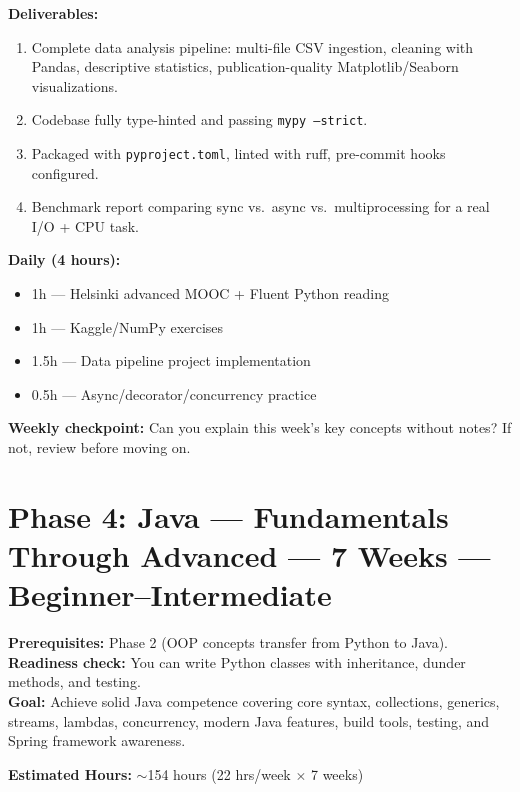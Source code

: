 \documentclass[11pt, a4paper, oneside]{report}
\begin{document}
\begin{milestonebox}
\textbf{Deliverables:}
\begin{enumerate}[leftmargin=*]
\item Complete data analysis pipeline: multi-file CSV ingestion, cleaning with Pandas, descriptive statistics, publication-quality Matplotlib/Seaborn visualizations.
\item Codebase fully type-hinted and passing \texttt{mypy --strict}.
\item Packaged with \texttt{pyproject.toml}, linted with ruff, pre-commit hooks configured.
\item Benchmark report comparing sync vs.\ async vs.\ multiprocessing for a real I/O + CPU task.
\end{enumerate}
\end{milestonebox}

\begin{practicebox}
\textbf{Daily (4 hours):}
\begin{itemize}[leftmargin=*]
\item 1h --- Helsinki advanced MOOC + Fluent Python reading
\item 1h --- Kaggle/NumPy exercises
\item 1.5h --- Data pipeline project implementation
\item 0.5h --- Async/decorator/concurrency practice
\end{itemize}


\textbf{Weekly checkpoint:} Can you explain this week's key concepts without notes? If not, review before moving on.
\end{practicebox}


\clearpage
\section[Phase 4: Java]{Phase 4: Java --- Fundamentals Through Advanced --- 7 Weeks --- Beginner--Intermediate}

\begin{prereqbox}
\textbf{Prerequisites:} Phase 2 (OOP concepts transfer from Python to Java).\\
\textbf{Readiness check:} You can write Python classes with inheritance, dunder methods, and testing.\\
\textbf{Goal:} Achieve solid Java competence covering core syntax, collections, generics, streams, lambdas, concurrency, modern Java features, build tools, testing, and Spring framework awareness.


\textbf{Estimated Hours:} $\sim$154 hours (22 hrs/week $\times$ 7 weeks)
\end{prereqbox}
\end{document}
